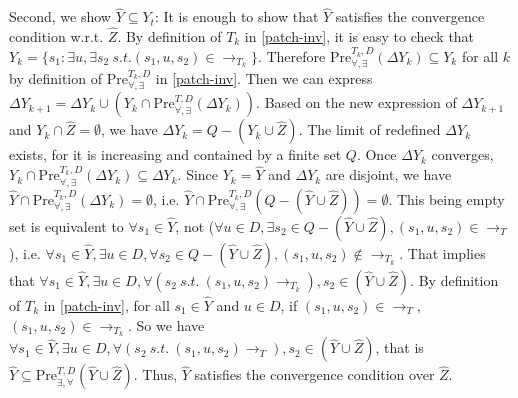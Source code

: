 Second, we show $ \widehat{Y}\subseteq Y_t $: It is enough to show that $ \widehat{Y} $ satisfies the convergence condition w.r.t. $ \widehat{Z} $. By definition of $ T_k $ in \eqref{patch-inv}, it is easy to check that $ Y_k = \{s_1: \exists u, \exists s_2\ s.t. (s_1,u,s_2)\in \rightarrow_{T_k}\} $. Therefore $ \text{Pre}_{\forall,\exists}^{T_k, D}(\Delta Y_k)\subseteq  Y_k$ for all $ k $ by definition of $ \text{Pre}^{T_k,D}_{\forall,\exists} $ in \eqref{patch-inv}. Then we can express $ \Delta Y_{k+1}= \Delta Y_k \cup (Y_k \cap \text{Pre}_{\forall,\exists}^{T, D}(\Delta Y_k)) $. Based on the new expression of $ \Delta Y_{k+1}$ and $ Y_k \cap \widehat{Z} = \emptyset $, we have $ \Delta Y_k = Q-(Y_k\cup \widehat{Z}) $. The limit of redefined $ \Delta Y_k $ exists, for it is increasing and contained by a finite set $ Q $. Once $ \Delta Y_k $ converges, $ Y_k \cap \text{Pre}_{\forall,\exists}^{T_k, D}(\Delta Y_k)\subseteq \Delta Y_k $. Since $ Y_k=\widehat{Y} $ and $ \Delta Y_k $ are disjoint, we have $ \widehat{Y} \cap \text{Pre}_{\forall,\exists}^{T_k, D}(\Delta Y_k) = \emptyset $, i.e.  $ \widehat{Y} \cap \text{Pre}_{\forall,\exists}^{T_k, D}(Q-(\widehat{Y}\cup \widehat{Z})) = \emptyset $. This being empty set is equivalent to $ \forall s_1 \in \widehat{Y}$, not ($\forall u\in D, \exists s_2\in Q-(\widehat{Y}\cup \widehat{Z}), (s_1,u,s_2)\in \rightarrow_{T} $), i.e. $ \forall s_1 \in \widehat{Y}, \exists u\in D, \forall s_2 \in Q-(\widehat{Y}\cup \widehat{Z}),  (s_1,u,s_2)\not\in \rightarrow_{T_k}$. That implies that $ \forall s_1\in \widehat{Y}, \exists u\in D, \forall (s_2\ s.t.\ (s_1,u,s_2)\rightarrow_{T_k}), s_2\in (\widehat{Y}\cup \widehat{Z}) $. By definition of $ T_k $ in \eqref{patch-inv},  for all $ s_1\in \widehat{Y} $ and $ u\in D $, if $ (s_1,u,s_2)\in \rightarrow_{T} $, $ (s_1,u,s_2)\in \rightarrow_{T_k} $. So we have $ \forall s_1\in \widehat{Y}, \exists u\in D, \forall (s_2\ s.t.\ (s_1,u,s_2)\rightarrow_{T}), s_2\in (\widehat{Y}\cup \widehat{Z}) $, that is $ \widehat{Y}\subseteq \text{Pre}_{\exists,\forall}^{T,D}(\widehat{Y}\cup \widehat{Z}) $. Thus, $ \widehat{Y} $ satisfies the convergence condition over $ \widehat{Z} $. \QEDB
